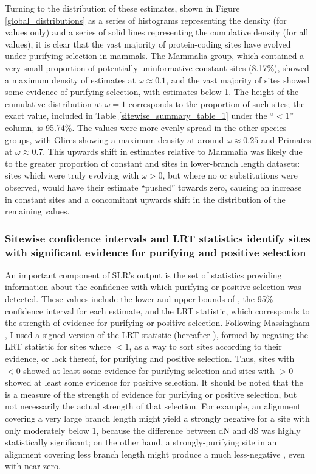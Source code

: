 Turning to the distribution of these \omgml estimates, shown in Figure
\ref{global_distributions} as a series of histograms representing the
\omgml density (for \nz values only) and a series of solid lines
representing the cumulative density (for all values), it is clear
that the vast majority of protein-coding sites have evolved under
purifying selection in mammals. The Mammalia group, which contained a
very small proportion of potentially uninformative constant sites
(8.17\%), showed a maximum density of \nz \omgml estimates at
$\omega\approx0.1$, and the vast majority of sites showed some
evidence of purifying selection, with \omgml estimates below 1. The
height of the \omgml cumulative distribution at $\omega=1$ corresponds
to the proportion of such sites; the exact value, included in Table
\ref{sitewise_summary_table_1} under the ``$< 1$'' column, is
95.74\%. The \nz \omgml values were more evenly spread in the other
species groups, with Glires showing a maximum \nz \omgml density at
around $\omega\approx0.25$ and Primates at $\omega\approx0.7$. This
upwards shift in \nz \omgml estimates relative to Mammalia was likely
due to the greater proportion of constant and \syn sites in
lower-branch length datasets: sites which were truly evolving with
$\omega>0$, but where no \nsyn or \syn substitutions were observed,
would have their \omgml estimate ``pushed'' towards zero, causing an
increase in constant sites and a concomitant upwards shift in the
distribution of the remaining \nz \omgml values.

\subsubsection{Sitewise confidence intervals and LRT statistics identify sites with significant evidence for purifying and positive selection}

An important component of SLR's output is the set of statistics
providing information about the confidence with which purifying or
positive selection was detected. These values include the lower and
upper bounds of \ci, the 95\% confidence interval for each \omgml
estimate, and the LRT statistic, which corresponds to the strength of
evidence for purifying or positive selection. Following Massingham
\citeyearpar{Massingham2005}, I used a signed version of the
LRT statistic (hereafter \slrt), formed by negating the LRT statistic
for sites where \omgml$<1$, as a way to sort sites according to their
evidence, or lack thereof, for purifying and positive selection. Thus,
sites with \slrt$<0$ showed at least some evidence for purifying
selection and sites with \slrt$>0$ showed at least some evidence for
positive selection. It should be noted that the \slrt is a measure of
the strength of evidence for purifying or positive selection, but not
necessarily the actual strength of that selection. For example, an
alignment covering a very large branch length might yield a strongly
negative \slrt for a site with \omgml only moderately below 1, because
the difference between dN and dS was highly statistically significant;
on the other hand, a strongly-purifying site in an alignment covering
less branch length might produce a much less-negative \slrt, even with
\omgml near zero.

